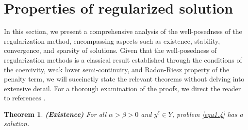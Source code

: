 \documentclass[a4paper,12pt]{article}
\newtheorem{theorem}{Theorem}[section]
\numberwithin{equation}{section}
\begin{document}
\section{Properties of regularized solution}\label{sec3}

\par In this section, we present a comprehensive analysis of the well-posedness of the regularization method, encompassing aspects such as existence, stability, convergence, and sparsity of solutions. Given that the well-posedness of regularization methods is a classical result established through the conditions of the coercivity, weak lower semi-continuity, and Radon-Riesz property of the penalty term, we will succinctly state the relevant theorems without delving into extensive detail. For a thorough examination of the proofs, we direct the reader to references \cite{DH19,EHN96}.

\begin{theorem}\label{the3.1}
    \textbf{(Existence)} For all $\alpha>\beta> 0$ and $y^{\delta}\in Y$, problem \eqref{equ1.4} has a solution.
\end{theorem}
\end{document}
